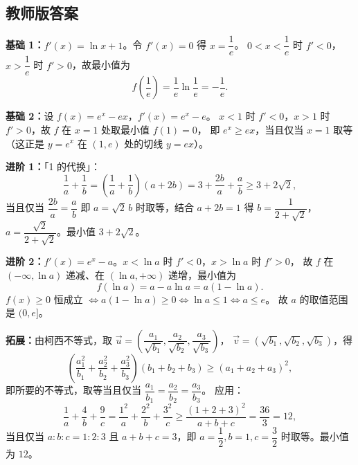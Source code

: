 \begin{afterclass}
\subsection*{教师版答案}
\begin{solution}
\textbf{基础 1：}$f'(x)=\ln x+1$。令 $f'(x)=0$ 得 $x=\dfrac1e$。
$0<x<\dfrac1e$ 时 $f'<0$，$x>\dfrac1e$ 时 $f'>0$，故最小值为
\[
  f\!\left(\frac1e\right)=\frac1e\ln\frac1e=-\frac1e .
\]
\end{solution}
\begin{solution}
\textbf{基础 2：}设 $f(x)=e^x-ex$，$f'(x)=e^x-e$。
$x<1$ 时 $f'<0$，$x>1$ 时 $f'>0$，故 $f$ 在 $x=1$ 处取最小值 $f(1)=0$，
即 $e^x\ge ex$，当且仅当 $x=1$ 取等（这正是 $y=e^x$ 在 $(1,e)$ 处的切线 $y=ex$）。
\end{solution}
\begin{solution}
\textbf{进阶 1：}「1 的代换」：
\[
  \frac1a+\frac1b=\left(\frac1a+\frac1b\right)(a+2b)
  =3+\frac{2b}{a}+\frac ab\ge3+2\sqrt2,
\]
当且仅当 $\dfrac{2b}{a}=\dfrac ab$ 即 $a=\sqrt2\,b$ 时取等，结合 $a+2b=1$ 得
$b=\dfrac1{2+\sqrt2}$，$a=\dfrac{\sqrt2}{2+\sqrt2}$。最小值 $3+2\sqrt2$。
\end{solution}
\begin{solution}
\textbf{进阶 2：}$f'(x)=e^x-a$。$x<\ln a$ 时 $f'<0$，$x>\ln a$ 时 $f'>0$，
故 $f$ 在 $(-\infty,\ln a)$ 递减、在 $(\ln a,+\infty)$ 递增，最小值为
\[
  f(\ln a)=a-a\ln a=a(1-\ln a).
\]
$f(x)\ge0$ 恒成立 $\iff a(1-\ln a)\ge0\iff\ln a\le1\iff a\le e$。
故 $a$ 的取值范围是 $(0,e]$。
\end{solution}
\begin{solution}
\textbf{拓展：}由柯西不等式，取
$\vec u=\left(\dfrac{a_1}{\sqrt{b_1}},\dfrac{a_2}{\sqrt{b_2}},\dfrac{a_3}{\sqrt{b_3}}\right)$，
$\vec v=(\sqrt{b_1},\sqrt{b_2},\sqrt{b_3})$，得
\[
  \left(\frac{a_1^2}{b_1}+\frac{a_2^2}{b_2}+\frac{a_3^2}{b_3}\right)(b_1+b_2+b_3)
  \ge(a_1+a_2+a_3)^2,
\]
即所要的不等式，取等当且仅当 $\dfrac{a_1}{b_1}=\dfrac{a_2}{b_2}=\dfrac{a_3}{b_3}$。
应用：
\[
  \frac1a+\frac4b+\frac9c=\frac{1^2}{a}+\frac{2^2}{b}+\frac{3^2}{c}
  \ge\frac{(1+2+3)^2}{a+b+c}=\frac{36}{3}=12,
\]
当且仅当 $a:b:c=1:2:3$ 且 $a+b+c=3$，即 $a=\dfrac12,b=1,c=\dfrac32$ 时取等。最小值为 $12$。
\end{solution}
\end{afterclass}